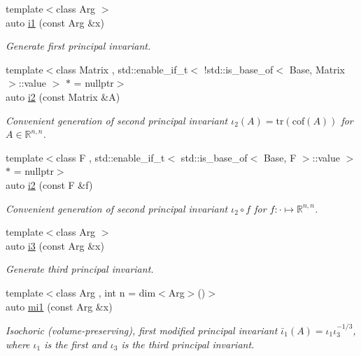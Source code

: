 \begin{DoxyCompactItemize}
{\footnotesize template$<$class Arg $>$ }\\auto \hyperlink{group__InvariantGroup_gafaead59b618d87239270f8eca2bf75c8}{i1} (const Arg \&x)
\begin{DoxyCompactList}\small\item\em Generate first principal invariant. \end{DoxyCompactList}\item 
{\footnotesize template$<$class Matrix , std\+::enable\+\_\+if\+\_\+t$<$ !std\+::is\+\_\+base\+\_\+of$<$ Base, Matrix $>$\+::value $>$ $\ast$  = nullptr$>$ }\\auto \hyperlink{group__InvariantGroup_ga9e442bab8f203bcd5634a3d0e65bf802}{i2} (const Matrix \&A)
\begin{DoxyCompactList}\small\item\em Convenient generation of second principal invariant $ \iota_2(A)=\mathrm{tr}(\mathrm{cof}(A)) $ for $A\in\mathbb{R}^{n,n}$. \end{DoxyCompactList}\item 
{\footnotesize template$<$class F , std\+::enable\+\_\+if\+\_\+t$<$ std\+::is\+\_\+base\+\_\+of$<$ Base, F $>$\+::value $>$ $\ast$  = nullptr$>$ }\\auto \hyperlink{group__InvariantGroup_gad3987f97353c8696e602ed1915b3cf47}{i2} (const F \&f)
\begin{DoxyCompactList}\small\item\em Convenient generation of second principal invariant $ \iota_2\circ f $ for $f:\cdot\mapsto\mathbb{R}^{n,n}$. \end{DoxyCompactList}\item 
{\footnotesize template$<$class Arg $>$ }\\auto \hyperlink{group__InvariantGroup_gae1ad80b4b2f34a10564114fad28bc313}{i3} (const Arg \&x)
\begin{DoxyCompactList}\small\item\em Generate third principal invariant. \end{DoxyCompactList}\item 
{\footnotesize template$<$class Arg , int n = dim$<$\+Arg$>$()$>$ }\\auto \hyperlink{group__InvariantGroup_ga7eed5e2661171d81e192ac1db791244c}{mi1} (const Arg \&x)
\begin{DoxyCompactList}\small\item\em Isochoric (volume-\/preserving), first modified principal invariant $ \bar\iota_1(A)=\iota_1\iota_3^{-1/3} $, where $\iota_1$ is the first and $\iota_3$ is the third principal invariant. \end{DoxyCompactList}\item 

\end{DoxyCompactItemize}
